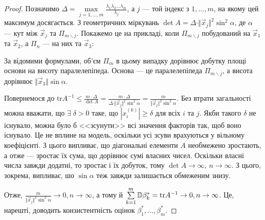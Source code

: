 \begin{proof}
    Позначимо 
    $\Delta = \underset{j=1,...,m}{\max}\frac{\lambda_1 \lambda_2 ... \lambda_m}{\lambda_j}$, а $j$ --- той індекс з $1,...,m$,
    на якому цей максимум досягається. З геометричних міркувань
    $\det A = \Delta \cdot \Vert \vec{x}_j \Vert^2 \sin^2 \alpha$, де $\alpha$ --- кут
    між $\vec{x}_j$ та $\Pi_{m \backslash j}$. Покажемо це на прикладі, коли $\Pi_{m \backslash j}$ побудований
    на $\vec{x}_1$ та $\vec{x}_2$, а $\Pi_n$ --- на них та $\vec{x}_3$:
    \begin{center}
    \end{center}
    За відомими формулами, об'єм $\Pi_m$ в цьому випадку дорівнює добутку площі основи на висоту паралелепіпеда.
    Основа --- це паралелепіпеда $\Pi_{m \backslash j}$, а висота дорівнює $\Vert \vec{x}_3 \Vert \sin \alpha$.

    Повернемося до $\mathrm{tr} A^{-1} \leq \frac{m\cdot\Delta}{\det A} = 
    \frac{m\cdot\Delta}{\Delta \cdot \Vert \vec{x}_j \Vert^2 \sin^2 \alpha} = 
    \frac{m}{\Vert \vec{x}_j \Vert^2 \sin^2 \alpha}$.
    Без втрати загальності можна вважати, що $\exists \; \delta > 0$ таке, що 
    $\left|x_i^{(k)}\right| \geq \delta$ для всіх $i$ та $j$. Якби такого $\delta$
    не існувало, можна було б <<зсунути>> всі значення факторів так, щоб воно існувало.
    Це не вплине на модель, оскільки усі зсуви врахуються у вільному коефіцієнті.
    З цього випливає, що діагональні елементи $A$ необмежено зростають, а отже --- зростає їх сума, що дорівнює сумі власних чисел.
    Оскільки власні числа завжди додатні, то зростає і їх добуток, тому $\det A \to \infty$, $n\to\infty$.
    З цього, зокрема, випливає, шо $\sin\alpha$ теж завжди залишається обмеженим знизу.
   
    Отже, $\frac{m}{\Vert \vec{x}_j \Vert^2 \sin^2 \alpha} \to 0, n\to\infty$, а тому й
    $\sum\limits_{k=1}^m \mathbb{D}\beta_k^* = \mathrm{tr}A^{-1} \to 0, n\to\infty$. Це, нарешті, доводить конзистентність оцінок $\beta_1^*, ..., \beta_m^*$.
\end{proof}

